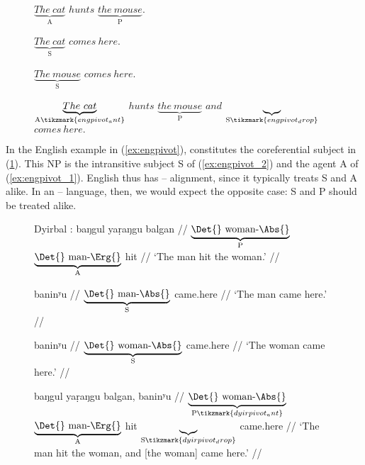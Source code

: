 \begin{figure}
\pex[belowexskip=1.75em]\label{ex:engpivot}%
	\a\label{ex:engpivot_1}%
		$\underbrace{The\ cat}_{\text{A}}$ 
		$hunts$ $\underbrace{the\ mouse}_{\text{P}}$.
	
	\a\label{ex:engpivot_2}%
		$\underbrace{The\ cat}_{\text{S}}$ $comes\ here.$
	
	\a\label{ex:engpivot_3}%
		$\underbrace{The\ mouse}_{\text{S}}$ $comes\ here.$
	
	\a\label{ex:engpivot_4}%
		$\underbrace{The\ cat}_{\text{A}\tikzmark{engpivot_ant}}$
		$hunts$
		$\underbrace{the\ mouse}_{\text{P}}$
		$and$
		$\underbrace{ }_{\text{S}\tikzmark{engpivot_drop}}$
		$comes\ here.$

\xe
\end{figure}

In the English example in (\ref{ex:engpivot}),  constitutes the
coreferential subject in (\ref{ex:engpivot_4}). This NP is the intransitive
subject S of (\ref{ex:engpivot_2}) and the agent A of (\ref{ex:engpivot_1}).
English thus has \Nom{}--\Acc{} alignment, since it typically treats S and A
alike. In an \Erg{}--\Abs{} language, then, we would expect the opposite case:
S and P should be treated alike.

\begin{figure}
\pex\label{ex:dyirpivot}%
Dyirbal \parencite[adapted from][112]{comrie1989}:
\a\label{ex:dyirpivot_1}
	\begingl
		 {baŋgul yaṛaŋgu} balgan //
		\glb $\underbrace{\text{\Det{} woman-\Abs{}}}_{\text{P}}$
			$\underbrace{\text{\Det{} man-\Erg{}}}_{\text{A}}$ hit //
		\glft `The man hit the woman.' //
	\endgl
	
\a\label{ex:dyirpivot_2}%
	\begingl
		 baninʸu //
		\glb $\underbrace{\text{\Det{} man-\Abs{}}}_{\text{S}}$ came.here //
		\glft `The man came here.' //
	\endgl
	
\a\label{ex:dyirpivot_3}%
	\begingl
		 baninʸu //
		\glb $\underbrace{\text{\Det{} woman-\Abs{}}}_{\text{S}}$ 
			came.here //
		\glft `The woman came here.' //
	\endgl
	
\a\label{ex:dyirpivot_4}%
	\begingl[aboveglftskip=1.75em]
		 {baŋgul yaṛaŋgu} balgan, {} baninʸu //
		\glb $\underbrace{\text{\Det{} woman-\Abs{}}}_%
				{\text{P}\tikzmark{dyirpivot_ant}}$
			$\underbrace{\text{\Det{} man-\Erg{}}}_{\text{A}}$
			hit 
			$\underbrace{ }_{\text{S}\tikzmark{dyirpivot_drop}}$
			came.here //
		\glft `The man hit the woman, and [the woman] came here.' //
	\endgl

\xe
\end{figure}


